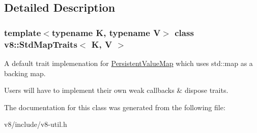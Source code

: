 \subsection{Detailed Description}
\subsubsection*{template$<$typename K, typename V$>$\newline
class v8\+::\+Std\+Map\+Traits$<$ K, V $>$}

A default trait implemenation for \mbox{\hyperlink{classv8_1_1PersistentValueMap}{Persistent\+Value\+Map}} which uses std\+::map as a backing map.

Users will have to implement their own weak callbacks \& dispose traits. 

The documentation for this class was generated from the following file\+:\begin{DoxyCompactItemize}
\item 
v8/include/v8-\/util.\+h\end{DoxyCompactItemize}
